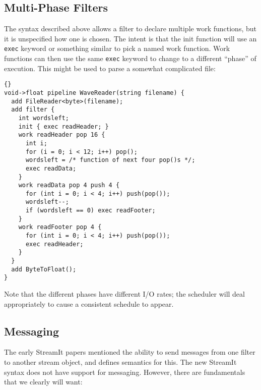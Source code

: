 \documentclass[11pt]{article}
\begin{document}
\subsection{Multi-Phase Filters}

The syntax described above allows a filter to declare multiple work
functions, but it is unspecified how one is chosen.  The intent is
that the init function will use an \lstinline|exec| keyword or
something similar to pick a named work function.  Work functions can
then use the same \lstinline|exec| keyword to change to a different
``phase'' of execution.  This might be used to parse a somewhat
complicated file:

\begin{lstlisting}{}
void->float pipeline WaveReader(string filename) {
  add FileReader<byte>(filename);
  add filter {
    int wordsleft;
    init { exec readHeader; }
    work readHeader pop 16 {
      int i;
      for (i = 0; i < 12; i++) pop();
      wordsleft = /* function of next four pop()s */;
      exec readData;
    }
    work readData pop 4 push 4 {
      for (int i = 0; i < 4; i++) push(pop());
      wordsleft--;
      if (wordsleft == 0) exec readFooter;
    }
    work readFooter pop 4 {
      for (int i = 0; i < 4; i++) push(pop());
      exec readHeader;
    }
  }
  add ByteToFloat();
}
\end{lstlisting}

Note that the different phases have different I/O rates; the scheduler
will deal appropriately to cause a consistent schedule to appear.

\subsection{Messaging}

The early StreamIt papers mentioned the ability to send messages from
one filter to another stream object, and defines semantics for this.
The new StreamIt syntax does not have support for messaging.  However,
there are fundamentals that we clearly will want:
\end{document}
